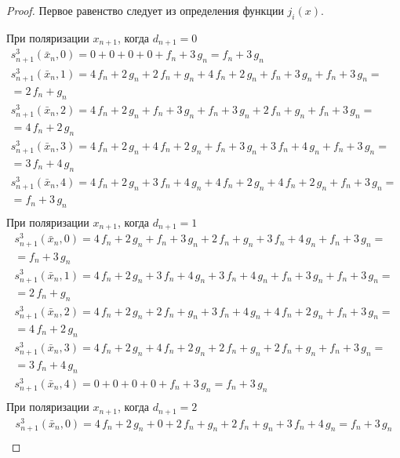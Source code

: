 \documentclass[bibliography=totoc, a4paper, 14pt]{extarticle}
\begin{document}
 \begin{proof}

Первое равенство следует из определения функции $j_i(x)$.

При поляризации $x_{n+1}$, когда $d_{n+1} = 0$
$$\begin{array}{l}
s_{n+1}^3(\bar{x}_n, 0) = 0 + 0 + 0 + 0 + f_n + 3\,g_n = f_n + 3\,g_n \\
s_{n+1}^3(\bar{x}_n, 1) = 4\,f_n + 2\,g_n + 2\,f_n + g_n + 4\,f_n + 2\,g_n + f_n + 3\,g_n + f_n + 3\,g_n =\\
= 2\,f_n + g_n \\
s_{n+1}^3(\bar{x}_n, 2) = 4\,f_n + 2\,g_n + f_n + 3\,g_n + f_n + 3\,g_n + 2\,f_n + g_n + f_n + 3\,g_n =\\
= 4\,f_n + 2\,g_n \\
s_{n+1}^3(\bar{x}_n, 3) = 4\,f_n + 2\,g_n + 4\,f_n + 2\,g_n + f_n + 3\,g_n + 3\,f_n + 4\,g_n + f_n + 3\,g_n =\\
= 3\,f_n + 4\,g_n \\
s_{n+1}^3(\bar{x}_n, 4) = 4\,f_n + 2\,g_n + 3\,f_n + 4\,g_n + 4\,f_n + 2\,g_n + 4\,f_n + 2\,g_n + f_n + 3\,g_n =\\
= f_n + 3\,g_n \\
\end{array}$$
При поляризации $x_{n+1}$, когда $d_{n+1} = 1$
$$\begin{array}{l}
s_{n+1}^3(\bar{x}_n, 0) = 4\,f_n + 2\,g_n + f_n + 3\,g_n + 2\,f_n + g_n + 3\,f_n + 4\,g_n + f_n + 3\,g_n =\\
= f_n + 3\,g_n \\
s_{n+1}^3(\bar{x}_n, 1) = 4\,f_n + 2\,g_n + 3\,f_n + 4\,g_n + 3\,f_n + 4\,g_n + f_n + 3\,g_n + f_n + 3\,g_n =\\
= 2\,f_n + g_n \\
s_{n+1}^3(\bar{x}_n, 2) = 4\,f_n + 2\,g_n + 2\,f_n + g_n + 3\,f_n + 4\,g_n + 4\,f_n + 2\,g_n + f_n + 3\,g_n =\\
= 4\,f_n + 2\,g_n \\
s_{n+1}^3(\bar{x}_n, 3) = 4\,f_n + 2\,g_n + 4\,f_n + 2\,g_n + 2\,f_n + g_n + 2\,f_n + g_n + f_n + 3\,g_n =\\
= 3\,f_n + 4\,g_n \\
s_{n+1}^3(\bar{x}_n, 4) = 0 + 0 + 0 + 0 + f_n + 3\,g_n = f_n + 3\,g_n \\
\end{array}$$
При поляризации $x_{n+1}$, когда $d_{n+1} = 2$
$$\begin{array}{l}
s_{n+1}^3(\bar{x}_n, 0) = 4\,f_n + 2\,g_n + 0 + 2\,f_n + g_n + 2\,f_n + g_n + 3\,f_n + 4\,g_n = f_n + 3\,g_n \\

\end{array}$$
\end{proof}
\end{document}
